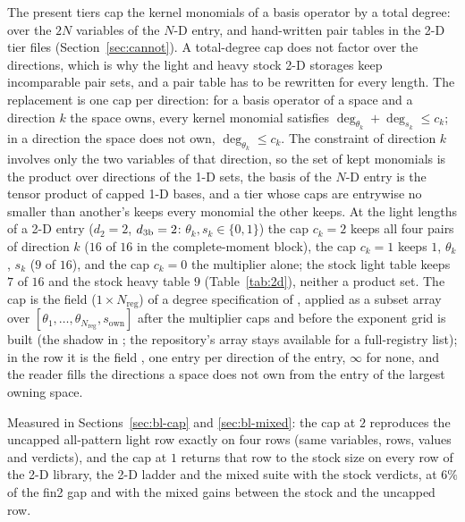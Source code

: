 The present tiers cap the kernel monomials of a basis operator by a total degree:  over the $2N$ variables of the $N$-D entry, and hand-written pair tables in the 2-D tier files (Section~\ref{sec:cannot}). A total-degree cap does not factor over the directions, which is why the light and heavy stock 2-D storages keep incomparable pair sets, and a pair table has to be rewritten for every length. The replacement is one cap per direction: for a basis operator of a space and a direction $k$ the space owns, every kernel monomial satisfies $\deg_{\theta_k}+\deg_{s_k}\le c_k$; in a direction the space does not own, $\deg_{\theta_k}\le c_k$. The constraint of direction $k$ involves only the two variables of that direction, so the set of kept monomials is the product over directions of the 1-D sets, the basis of the $N$-D entry is the tensor product of capped 1-D bases, and a tier whose caps are entrywise no smaller than another's keeps every monomial the other keeps. At the light lengths of a 2-D entry ($d_2=2$, $d_{3\mathrm{b}}=2$: $\theta_k,s_k\in\{0,1\}$) the cap $c_k=2$ keeps all four pairs of direction $k$ ($16$ of $16$ in the complete-moment block), the cap $c_k=1$ keeps $1$, $\theta_k$, $s_k$ ($9$ of $16$), and the cap $c_k=0$ the multiplier alone; the stock light table keeps $7$ of $16$ and the stock heavy table $9$ (Table~\ref{tab:2d}), neither a product set. The cap is the field  ($1\times N_{\mathrm{reg}}$) of a degree specification of , applied as a subset array over $[\theta_1,\dots,\theta_{N_{\mathrm{reg}}},s_{\mathrm{own}}]$ after the multiplier caps and before the exponent grid is built (the shadow in ; the repository's  array stays available for a full-registry list); in the row it is the field , one entry per direction of the entry, $\infty$ for none, and the reader fills the directions a space does not own from the entry of the largest owning space.

Measured in Sections~\ref{sec:bl-cap} and \ref{sec:bl-mixed}: the cap at $2$ reproduces the uncapped all-pattern light row exactly on four rows (same variables, rows, values and verdicts), and the cap at $1$ returns that row to the stock size on every row of the 2-D library, the 2-D ladder and the mixed suite with the stock verdicts, at $6\%$ of the fin2 gap and with the mixed gains between the stock and the uncapped row.
